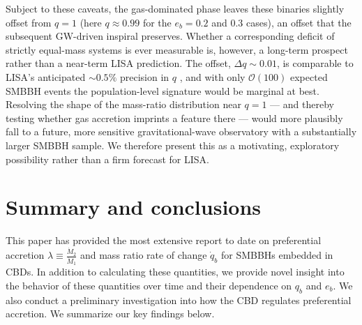 \documentclass[fleqn,usenatbib]{mnras}
\begin{document}
Subject to these caveats, the gas-dominated phase leaves these binaries slightly offset from $q = 1$ (here $q \approx 0.99$ for the $e_b = 0.2$ and $0.3$ cases), an offset that the subsequent GW-driven inspiral preserves. Whether a corresponding deficit of strictly equal-mass systems is ever measurable is, however, a long-term prospect rather than a near-term LISA prediction. The offset, $\Delta q \sim 0.01$, is comparable to LISA's anticipated ${\sim}0.5\%$ precision in $q$ \citep{Mangiagli_2020}, and with only $\mathcal{O}(100)$ expected SMBBH events the population-level signature would be marginal at best. Resolving the shape of the mass-ratio distribution near $q = 1$ --- and thereby testing whether gas accretion imprints a feature there --- would more plausibly fall to a future, more sensitive gravitational-wave observatory with a substantially larger SMBBH sample. We therefore present this as a motivating, exploratory possibility rather than a firm forecast for LISA.

\section{Summary and conclusions}\label{sec:conclusion}
This paper has provided the most extensive report to date on preferential accretion $\lambda \equiv \frac{\dot{M}_2}{\dot{M}_1}$ and mass ratio rate of change $\dot{q}_b$ for SMBBHs embedded in CBDs. In addition to calculating these quantities, we provide novel insight into the behavior of these quantities over time and their dependence on $q_b$ and $e_b$. We also conduct a preliminary investigation into how the CBD regulates preferential accretion. We summarize our key findings below.
\end{document}
